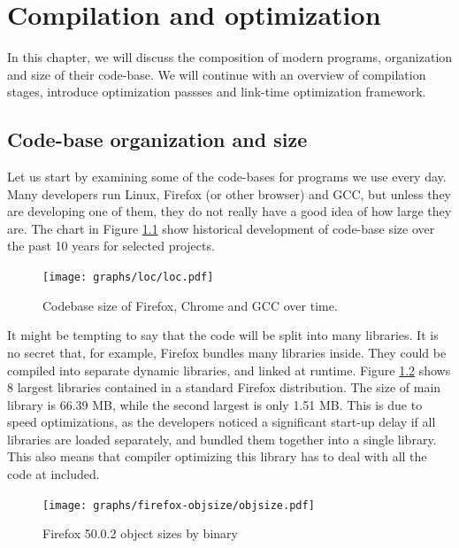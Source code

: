 \newcommand{\definice}{\paragraph{Definice.}}

\chapter{Compilation and optimization}

In this chapter, we will discuss the composition of modern
programs, organization and size of their code-base. We will continue with an
overview of compilation stages, introduce optimization passses and link-time
optimization framework.

\section{Code-base organization and size}

Let us start by examining some of the code-bases for programs we use every day.
Many developers run Linux, Firefox (or other browser) and GCC, but
unless they are developing one of them, they do not really have a good idea of how large
they are. The chart in Figure \ref{figure-loc} show historical development of
code-base size over the past 10 years for selected projects.

\begin{figure}[h!]
\label{figure-loc}
\centering
	\hspace{-1cm}\texttt{[image: graphs/loc/loc.pdf]}
\caption{Codebase size of Firefox, Chrome and GCC over time. }
\end{figure}

It might be tempting to say that the code will be split into many libraries. It
is no secret that, for example, Firefox bundles many libraries inside. They
could be compiled into separate dynamic libraries, and linked at runtime. Figure
\ref{figure-firefox-objsize} shows 8 largest libraries contained in a standard
Firefox distribution. The size of main library is 66.39 MB, while the second
largest is only 1.51 MB. This is due to speed optimizations, as the developers
noticed a significant start-up delay if all libraries are loaded separately, and
bundled them together into a single library. This also means that compiler
optimizing this library has to deal with all the code at included.

\begin{figure}[h!]
\label{figure-firefox-objsize}
\centering
\texttt{[image: graphs/firefox-objsize/objsize.pdf]}
\caption{Firefox 50.0.2 object sizes by binary}
\end{figure}

